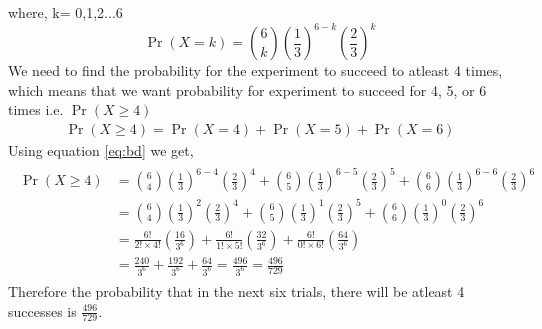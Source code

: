 \documentclass[journal,12pt,twocolumn]{IEEEtran}
\begin{document}
where, k= 0,1,2...6
\begin{equation}
\label{eq:bd}
\Pr(X=k) = \binom{6}{k}\left(\frac{1}{3}\right)^{6-k}\left(\frac{2}{3}\right)^{k}
\end{equation}
We need to find the probability for the experiment to succeed to atleast 4 times, which means that we want probability for experiment to succeed for 4, 5, or 6 times i.e. $\Pr(X \ge 4)$
\begin{align}
\Pr(X \ge 4)= \Pr(X=4)+ \Pr(X=5)+ \Pr(X=6)
\end{align}
Using equation \ref{eq:bd} we get,
\begin{align}
\begin{split}
\Pr(X \ge 4)&= \binom{6}{4}\left(\frac{1}{3}\right)^{6-4}\left(\frac{2}{3}\right)^{4}+ \binom{6}{5}\left(\frac{1}{3}\right)^{6-5}\left(\frac{2}{3}\right)^{5}+ \binom{6}{6}\left(\frac{1}{3}\right)^{6-6}\left(\frac{2}{3}\right)^{6}\\
&=\binom{6}{4}\left(\frac{1}{3}\right)^{2}\left(\frac{2}{3}\right)^{4}+ \binom{6}{5}\left(\frac{1}{3}\right)^{1}\left(\frac{2}{3}\right)^{5}+ \binom{6}{6}\left(\frac{1}{3}\right)^{0}\left(\frac{2}{3}\right)^{6}\\
&=\frac{6!}{2!\times 4!}\left(\frac{16}{3^{6}}\right)+ \frac{6!}{1!\times 5!}\left(\frac{32}{3^{6}}\right)+ \frac{6!}{0!\times 6!}\left(\frac{64}{3^{6}}\right)\\
&= \frac{240}{3^{6}}+ \frac{192}{3^{6}}+ \frac{64}{3^{6}}= \frac{496}{3^{6}}= \frac{496}{729}
\end{split}
\end{align}
Therefore the probability that in the next six trials, there will be atleast 4 successes is $\frac{496}{729}$.
\end{document}
